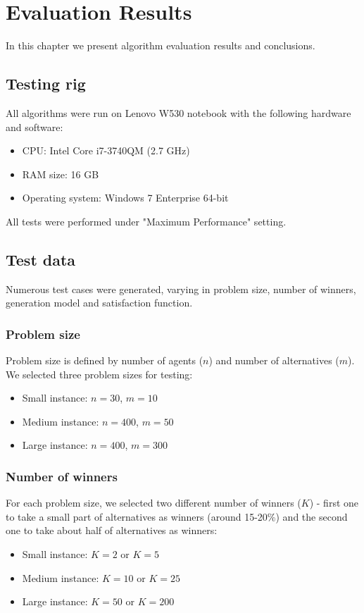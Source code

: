 \chapter{Evaluation Results}
\label{cha:evaluationResults}

In this chapter we present algorithm evaluation results and conclusions.

\section{Testing rig}

All algorithms were run on Lenovo W530 notebook with the following hardware and software:
\begin{itemize}
	\item CPU: Intel Core i7-3740QM (2.7 GHz)
	\item RAM size: 16 GB
	\item Operating system: Windows 7 Enterprise 64-bit
\end{itemize}

All tests were performed under "Maximum Performance" setting.

\section{Test data}

Numerous test cases were generated, varying in problem size, number of winners, generation model and satisfaction function.

\subsection{Problem size}

Problem size is defined by number of agents ($n$) and number of alternatives ($m$). We selected three problem sizes for testing:
\begin{itemize}
	\item Small instance: $n = 30$, $m = 10$
	\item Medium instance: $n = 400$, $m = 50$
	\item Large instance: $n = 400$, $m = 300$
\end{itemize}

\subsection{Number of winners}

For each problem size, we selected two different number of winners ($K$) - first one to take a small part of alternatives as winners (around 15-20\%) and the second one to take about half of alternatives as winners:
\begin{itemize}
	\item Small instance: $K = 2$ or $K = 5$
	\item Medium instance: $K = 10$ or $K = 25$
	\item Large instance: $K = 50$ or $K = 200$
\end{itemize}

